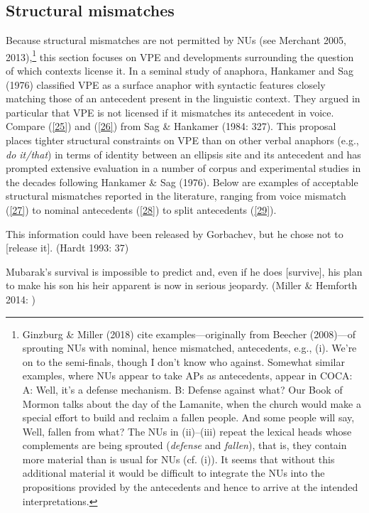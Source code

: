 \documentclass[output=paper
                ,modfonts
                ,nonflat
	        ,collection
	        ,collectionchapter
	        ,collectiontoclongg
 	        ,biblatex
                ,babelshorthands
                ,newtxmath
                ,draftmode
                ,colorlinks, citecolor=brown
]{./langsci/langscibook}
\begin{document}
{\subsection{Structural mismatches}
 Because structural mismatches are not permitted by NUs (see Merchant 2005, 2013),\footnote{Ginzburg \& Miller (2018) cite examples---originally from Beecher (2008)---of sprouting NUs with nominal, hence mismatched, antecedents, e.g., (i).
 \ea We're on to the semi-finals, though I don't know who against.\z
 Somewhat similar examples, where NUs appear to take APs as antecedents, appear in COCA:
 \ea  A: Well, it's a defense mechanism. B: Defense against what?\z
 \ea Our Book of Mormon talks about the day of the Lamanite, when the church would make a special effort to build and reclaim a fallen people. And some people will say, Well, fallen from what? \z
The NUs in (ii)--(iii) repeat the lexical heads whose complements are being sprouted ({\it defense} and {\it fallen}), that is, they contain more material than is usual for NUs (cf. (i)). It seems that without this additional material it would be difficult to integrate the NUs into the propositions provided by the antecedents and hence to arrive at the intended interpretations.
} this section focuses on VPE and developments surrounding the question of which contexts license it. In a seminal study of anaphora, Hankamer and Sag (1976) classified VPE as a surface anaphor with syntactic features closely matching those of an antecedent present in the linguistic context. They argued in particular that VPE is not licensed if it mismatches its antecedent in voice. Compare (\ref{25}) and (\ref{26}) from Sag \& Hankamer (1984: 327).
\z
{}
\z
This proposal places tighter structural constraints on VPE than on other verbal anaphors (e.g., \emph{do it/that}) in terms of identity between an ellipsis site and its antecedent and has prompted extensive evaluation in a number of corpus and experimental studies in the decades following Hankamer \& Sag (1976). Below are examples of acceptable structural mismatches reported in the literature, ranging from voice mismatch (\ref{27}) to nominal antecedents (\ref{28}) to split antecedents (\ref{29}).

\ea This information could have been released by Gorbachev, but he chose not to [release it]. (Hardt 1993: 37) \label{27}\z

\ea Mubarak's survival is impossible to predict and, even if he does [survive], his plan to make his son his heir apparent is now in serious jeopardy. (Miller \& Hemforth 2014: )\label{28}\z

}
\end{document}
